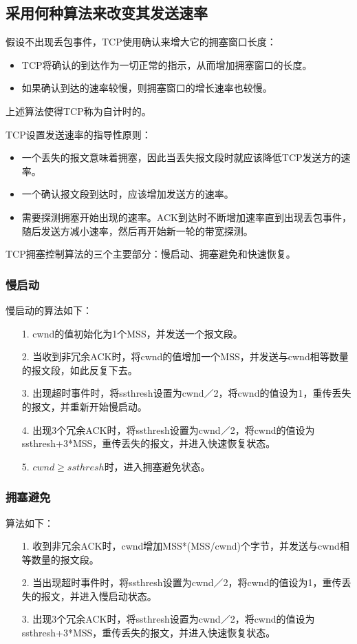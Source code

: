 \documentclass[a4paper,left=2.5cm,right=2.5cm,11pt]{article}
\begin{document}
\subsection{采用何种算法来改变其发送速率}
	假设不出现丢包事件，TCP使用确认来增大它的拥塞窗口长度：
	\begin{itemize}
		\item TCP将确认的到达作为一切正常的指示，从而增加拥塞窗口的长度。
		\item 如果确认到达的速率较慢，则拥塞窗口的增长速率也较慢。
	\end{itemize}

	上述算法使得TCP称为自计时的。\par

	TCP设置发送速率的指导性原则：
	\begin{itemize}
		\item 一个丢失的报文意味着拥塞，因此当丢失报文段时就应该降低TCP发送方的速率。
		\item 一个确认报文段到达时，应该增加发送方的速率。
		\item 需要探测拥塞开始出现的速率。ACK到达时不断增加速率直到出现丢包事件，随后发送方减小速率，然后再开始新一轮的带宽探测。
	\end{itemize}

	TCP拥塞控制算法的三个主要部分：慢启动、拥塞避免和快速恢复。\par

\subsubsection{慢启动}
	慢启动的算法如下：
	\begin{itemize}
		\item[1.] cwnd的值初始化为1个MSS，并发送一个报文段。
		\item[2.] 当收到非冗余ACK时，将cwnd的值增加一个MSS，并发送与cwnd相等数量的报文段，如此反复下去。
		\item[3.] 出现超时事件时，将ssthresh设置为cwnd／2，将cwnd的值设为1，重传丢失的报文，并重新开始慢启动。
		\item[4.] 出现3个冗余ACK时，将ssthresh设置为cwnd／2，将cwnd的值设为ssthresh+3*MSS，重传丢失的报文，并进入快速恢复状态。
		\item[5.] $cwnd \ge ssthresh$时，进入拥塞避免状态。
	\end{itemize}

\subsubsection{拥塞避免}
	算法如下：
	\begin{itemize}
		\item[1.] 收到非冗余ACK时，cwnd增加MSS*(MSS/cwnd)个字节，并发送与cwnd相等数量的报文段。
		\item[2.] 当出现超时事件时，将ssthresh设置为cwnd／2，将cwnd的值设为1，重传丢失的报文，并进入慢启动状态。
		\item[3.] 出现3个冗余ACK时，将ssthresh设置为cwnd／2，将cwnd的值设为ssthresh+3*MSS，重传丢失的报文，并进入快速恢复状态。
	\end{itemize}
\end{document}
